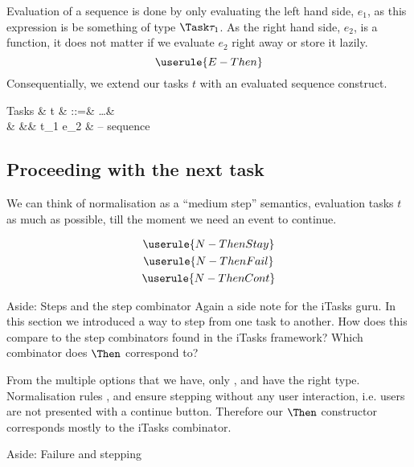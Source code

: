 Evaluation of a sequence is done by only evaluating the left hand side, $e_1$,
as this expression is be something of type $\Task \tau_1$.
As the right hand side, $e_2$, is a function,
it does not matter if we evaluate $e_2$ right away or store it lazily.
\begin{equation*}
  \userule{E-Then}
\end{equation*}
Consequentially, we extend our tasks $t$ with an evaluated sequence construct.
\begin{grammar}
  Tasks
    & t & ::=& \ldots        & \\
    &   &\mid& t_1 \Then e_2 & – sequence \\
\end{grammar}


\subsection{Proceeding with the next task}

We can think of normalisation as a \enquote{medium step} semantics,
evaluation tasks $t$ as much as possible,
till the moment we need an event to continue.

\begin{gather*}
  \userule{N-ThenStay} \\
  \userule{N-ThenFail} \\
  \userule{N-ThenCont}
\end{gather*}

\begin{margintext}{Aside: Steps and the step combinator}
Again a side note for the iTasks guru.
In this section we introduced a way to step from one task to another.
How does this compare to the step combinators found in the iTasks framework?
Which combinator does $\Then$ correspond to?

From the multiple options that we have,
only \type{(>>=)}, \type{(>>-)} and \type{(>>\texttilde)} have the right type.
Normalisation rules ,  and  ensure stepping without any user interaction,
i.e. users are not presented with a continue button.
Therefore our $\Then$ constructor corresponds mostly to the iTasks \type{(>>-)} combinator.
\end{margintext}

\begin{margintext}{Aside: Failure and stepping}
\end{margintext}



